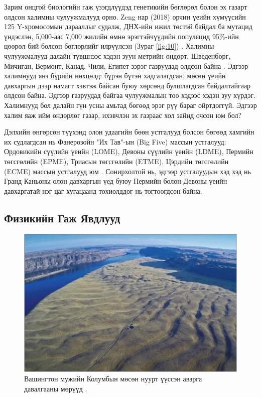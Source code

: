 \documentclass[10pt,twocolumn,letterpaper]{article}
\begin{document}
Зарим онцгой биологийн гаж үзэгдлүүдэд генетикийн бөглөрөл болон эх газарт олдсон халимны чулуужмалууд орно. Zeng нар (2018) орчин үеийн хүмүүсийн 125 Y-хромосомын дарааллыг судалж, ДНХ-ийн ижил төстэй байдал ба мутацид үндэслэн, 5,000-аас 7,000 жилийн өмнө эрэгтэйчүүдийн популяцид 95\%-ийн цөөрөл бий болсон бөглөрлийг илрүүлсэн (Зураг \ref{fig:10}) \cite{62}. Халимны чулуужмалууд далайн түвшнээс хэдэн зуун метрийн өндөрт, Шведенборг, Мичиган, Вермонт, Канад, Чили, Египет зэрэг газруудад олдсон байна \cite{63,64,65,66}. Эдгээр халимнууд янз бүрийн нөхцөлд: бүрэн бүтэн хадгалагдсан, мөсөн үеийн давхаргын дээр намагт хэвтэж байсан буюу хөрсөнд булшлагдсан байдалтайгаар олдсон байна. Эдгээр газруудад байгаа чулуужмалын тоо хэдээс хэдэн зуу хүрдэг. Халимнууд бол далайн гүн усны амьтад бөгөөд эрэг рүү бараг ойртдоггүй. Эдгээр халим яаж ийм өндөрлөг газар, ихэвчлэн эх газраас хол зайнд очсон юм бол?

Дэлхийн өнгөрсөн түүхэнд олон удаагийн бөөн устгалууд болсон бөгөөд хамгийн их судлагдсан нь Фанерозойн "Их Тав"-ын (Big Five) массын устгалууд: Ордовикийн сүүлийн үеийн (LOME), Девоны сүүлийн үеийн (LDME), Пермийн төгсгөлийн (EPME), Триасын төгсгөлийн (ETME), Цэрдийн төгсгөлийн (ECME) массын устгалууд юм \cite{88,89}. Сонирхолтой нь, эдгээр устгалуудын хэд хэд нь Гранд Каньоны олон давхаргын үед буюу Пермийн болон Девоны үеийн давхаргатай нэг цаг хугацаанд тохиолддог нь тогтоогдсон байна.

\subsection{Физикийн Гаж Явдлууд}

\begin{figure}[b]
\begin{center}
   \includegraphics[width=1\linewidth]{columbia.jpg}
\end{center}

\caption{Вашингтон мужийн Колумбын мөсөн нуурт үүссэн аварга давалгааны мөрүүд \cite{80}.}
\label{fig:11}
\label{fig:onecol}
\end{figure}
\end{document}
